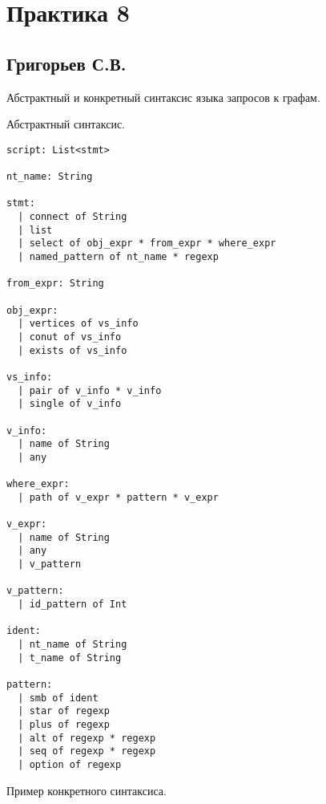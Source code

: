 \section{Практика 8}

\subsection{Григорьев С.В.}

Абстрактный и конкретный синтаксис языка запросов к графам.

Абстрактный синтаксис.

\begin{verbatim}
script: List<stmt>

nt_name: String

stmt:
  | connect of String
  | list
  | select of obj_expr * from_expr * where_expr
  | named_pattern of nt_name * regexp

from_expr: String

obj_expr:
  | vertices of vs_info  
  | conut of vs_info
  | exists of vs_info

vs_info:
  | pair of v_info * v_info
  | single of v_info

v_info:
  | name of String
  | any
  
where_expr:
  | path of v_expr * pattern * v_expr

v_expr: 
  | name of String
  | any 
  | v_pattern

v_pattern:
  | id_pattern of Int   

ident: 
  | nt_name of String 
  | t_name of String

pattern: 
  | smb of ident
  | star of regexp
  | plus of regexp
  | alt of regexp * regexp
  | seq of regexp * regexp
  | option of regexp

\end{verbatim}

Пример конкретного синтаксиса.

